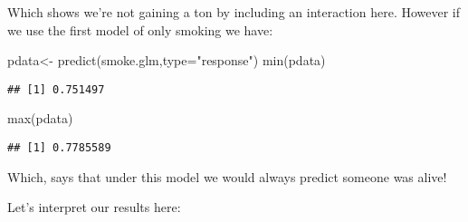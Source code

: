 \documentclass[
]{article}
\newenvironment{Shaded}{\begin{snugshade}}{\end{snugshade}}
\newcommand{\AttributeTok}[1]{\textcolor[rgb]{0.77,0.63,0.00}{#1}}
\newcommand{\FunctionTok}[1]{\textcolor[rgb]{0.00,0.00,0.00}{#1}}
\newcommand{\NormalTok}[1]{#1}
\newcommand{\OtherTok}[1]{\textcolor[rgb]{0.56,0.35,0.01}{#1}}
\newcommand{\StringTok}[1]{\textcolor[rgb]{0.31,0.60,0.02}{#1}}
\begin{document}
Which shows we're not gaining a ton by including an interaction here.
However if we use the first model of only smoking we have:

\begin{Shaded}
\begin{Highlighting}[]
\NormalTok{pdata}\OtherTok{\textless{}{-}} \FunctionTok{predict}\NormalTok{(smoke.glm,}\AttributeTok{type=}\StringTok{"response"}\NormalTok{)}
\FunctionTok{min}\NormalTok{(pdata)}
\end{Highlighting}
\end{Shaded}

\begin{verbatim}
## [1] 0.751497
\end{verbatim}

\begin{Shaded}
\begin{Highlighting}[]
\FunctionTok{max}\NormalTok{(pdata)}
\end{Highlighting}
\end{Shaded}

\begin{verbatim}
## [1] 0.7785589
\end{verbatim}

Which, says that under this model we would always predict someone was
alive!

Let's interpret our results here:
\end{document}
